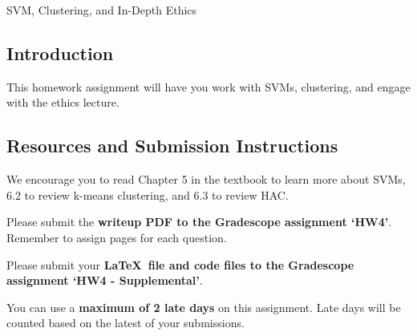 \documentclass[submit]{../harvardml}
\begin{document}
\begin{center}
{\Large SVM, Clustering, and In-Depth Ethics}\\
\end{center}

\subsection*{Introduction}

This homework assignment will have you work with SVMs, clustering, and engage with the ethics lecture.

\subsection*{Resources and Submission Instructions}
We encourage you to
read Chapter 5 in the textbook to learn more about SVMs, 6.2 to review k-means clustering, and 6.3 to review HAC. %

Please submit the \textbf{writeup PDF to the Gradescope assignment `HW4'}. Remember to assign pages for each question.

Please submit your \textbf{\LaTeX\ file and code files to the Gradescope assignment `HW4 - Supplemental'}. 

You can use a \textbf{maximum of 2 late days} on this assignment.  Late days will be counted based on the latest of your submissions. 

\newpage
\end{document}
